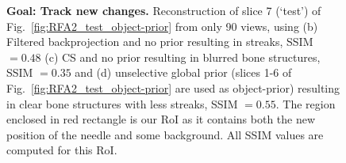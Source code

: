 \documentclass[journal]{IEEEtran}
\begin{document}
\begin{figure}[!h]
\caption[Representative results-1]{\textbf{Goal: Track new changes.}\small{ Reconstruction of slice 7 (`test') of Fig.~\ref{fig:RFA2_test_object-prior} from only 90 views, using (b) Filtered backprojection and no prior resulting in streaks, SSIM $= 0.48$ (c) CS and no prior resulting in blurred bone structures, SSIM $=0.35$ and (d) unselective global prior (slices 1-6 of Fig.~\ref{fig:RFA2_test_object-prior} are used as object-prior) resulting in clear bone structures with less streaks, SSIM $=0.55$. The region enclosed in red rectangle is our RoI as it contains both the new position of the needle and some background. All SSIM values are computed for this RoI.}}
\label{fig:RFA2_very_few_views}
\end{figure}

\end{document}
